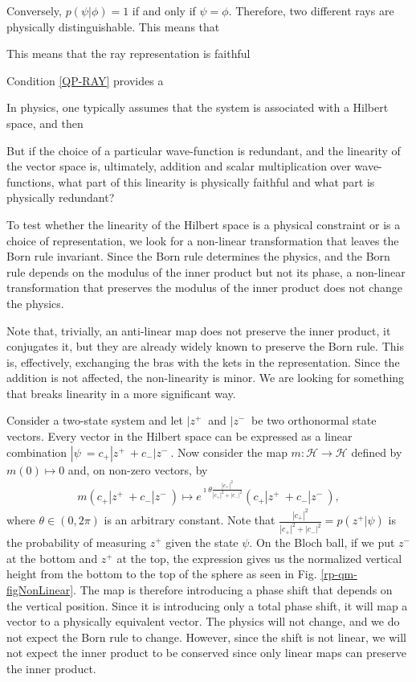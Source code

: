 Conversely, $p(\psi|\phi) = 1$ if and only if $\psi = \phi$. Therefore, two different rays are physically distinguishable. This means that 

This means that the ray representation is faithful
\begin{thrm}
	Condition \ref{QP-RAY} provides a
\end{thrm}

In physics, one typically assumes that the system is associated with a Hilbert space, and then 

But if the choice of a particular wave-function is redundant, and the linearity of the vector space is, ultimately, addition and scalar multiplication over wave-functions, what part of this linearity is physically faithful and what part is physically redundant?

To test whether the linearity of the Hilbert space is a physical constraint or is a choice of representation, we look for a non-linear transformation that leaves the Born rule invariant. Since the Born rule determines the physics, and the Born rule depends on the modulus of the inner product but not its phase, a non-linear transformation that preserves the modulus of the inner product does not change the physics.

Note that, trivially, an anti-linear map does not preserve the inner product, it conjugates it, but they are already widely known to preserve the Born rule. This is, effectively, exchanging the bras with the kets in the representation. Since the addition is not affected, the non-linearity is minor. We are looking for something that breaks linearity in a more significant way.

Consider a two-state system and let $|z^+\>$ and $|z^-\>$ be two orthonormal state vectors. Every vector in the Hilbert space can be expressed as a linear combination $|\psi\> = c_{+} | z^+ \> + c_{-} | z^- \>$. Now consider the map $m : \mathcal{H} \to \mathcal{H}$ defined by $m(0) \mapsto 0$ and, on non-zero vectors, by
\begin{equation}
	\begin{aligned}
	m(c_{+} | z^+ \> + c_{-} | z^- \>) \mapsto e^{\imath \theta \frac{|c_{+}|^2}{|c_{+}|^2+|c_{-}|^2}} ( c_{+} | z^+ \> + c_{-}  | z^- \>),
	\end{aligned}
\end{equation}
where $\theta \in (0,2\pi)$ is an arbitrary constant. Note that $\frac{|c_{+}|^2}{|c_{+}|^2+|c_{-}|^2} = p(z^+|\psi)$ is the probability of measuring $z^+$ given the state $\psi$. On the Bloch ball, if we put $z^-$ at the bottom and $z^+$ at the top, the expression gives us the normalized vertical height from the bottom to the top of the sphere as seen in Fig. \ref{rp-qm-figNonLinear}. The map is therefore introducing a phase shift that depends on the vertical position. Since it is introducing only a total phase shift, it will map a vector to a physically equivalent vector. The physics will not change, and we do not expect the Born rule to change. However, since the shift is not linear, we will not expect the inner product to be conserved since only linear maps can preserve the inner product.


